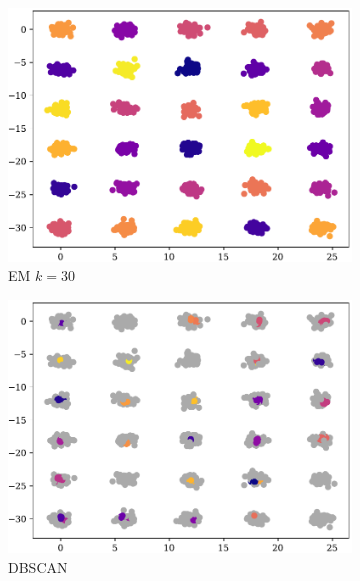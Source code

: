 \begin{figure}[t!]
    \begin{subfigure}[b]{0.45\textwidth}
        \includegraphics[width=\textwidth]{../plots/30-30-6_pred_em.pdf}
        \caption{EM $k = 30$}
        \label{subfig:30-30-6-em}
    \end{subfigure}
    \hspace{0.09\textwidth}
    \begin{subfigure}[b]{0.45\textwidth}
        \includegraphics[width=\textwidth]{../plots/30-30-6_pred_dbscan.pdf}
        \caption{DBSCAN}
        \label{subfig:30-30-6-dbscan}
    \end{subfigure}
    \begin{subfigure}[b]{0.45\textwidth}

\end{subfigure}
\end{figure}
